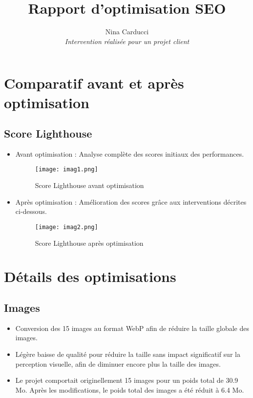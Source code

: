 \documentclass[12pt, a4paper]{article}
\title{\textbf{Rapport d'optimisation SEO}}
\author{
  Nina Carducci\\
  \textit{Intervention réalisée pour un projet client}
}
\date{\vspace{-1.5cm}}
\begin{document}
\maketitle
\thispagestyle{empty}

\tableofcontents
\newpage

\section{Comparatif avant et après optimisation}
\subsection{Score Lighthouse}
\begin{itemize}
    \item Avant optimisation : Analyse complète des scores initiaux des performances.
    \begin{figure}[h!] %
    \centering %
    \texttt{[image: imag1.png]} %
    \caption{Score Lighthouse avant optimisation} %
    \label{imag1.png} %
    \end{figure}
    \newpage
    \item Après optimisation : Amélioration des scores grâce aux interventions décrites ci-dessous.
    \begin{figure}[h!] %
    \centering %
    \texttt{[image: imag2.png]} %
    \caption{Score Lighthouse après optimisation} %
    \label{imag2.png} %
    \end{figure}
\end{itemize}

\newpage
\section{Détails des optimisations}
\subsection{Images}
\begin{itemize}
    \item Conversion des 15 images au format WebP afin de réduire la taille globale des images.
    \item Légère baisse de qualité pour réduire la taille sans impact significatif sur la perception visuelle, afin de diminuer encore plus la taille des images.
    \item Le projet comportait originellement 15 images pour un poids total de 30.9 Mo. Après les modifications, le poids total des images a été réduit à 6.4 Mo.
\end{itemize}
\end{document}

